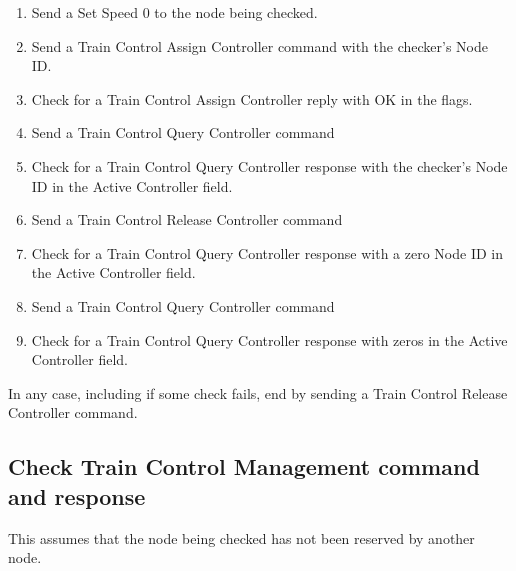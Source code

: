 \begin{enumerate}

    \item Send a Set Speed 0 to the node being checked.
    
    \item Send a Train Control Assign Controller command with the checker's Node ID.
    \item Check for a Train Control Assign Controller reply with OK in the flags.

    \item Send a Train Control Query Controller command
    \item Check for a Train Control Query Controller response with the checker's Node ID
        in the Active Controller field.

    \item Send a Train Control Release Controller command
    \item Check for a Train Control Query Controller response with a zero Node ID
        in the Active Controller field.

    \item Send a Train Control Query Controller command
    \item Check for a Train Control Query Controller response with zeros
        in the Active Controller field.

\end{enumerate}

In any case, including if some check fails, end by sending a Train Control Release
Controller command.


\subsection{Check Train Control Management command and response}

This assumes that the node being checked has not been reserved by another node.

